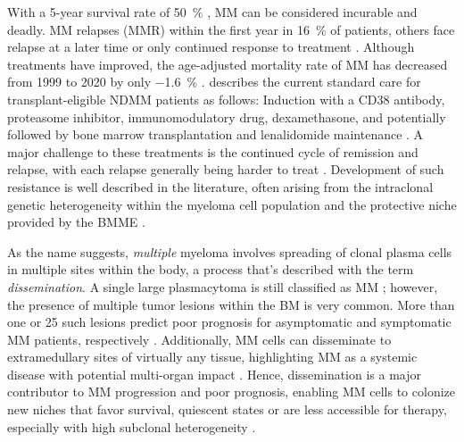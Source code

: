 With a 5-year survival rate of \SI{50}{\percent}
\cite{turessonRapidlyChangingMyeloma2018}, \ac{MM} can be considered incurable
and deadly. \ac{MM} relapses (\acs{MMR}) within the first year in \SI{16}{\percent} of
patients, others face relapse at a later time or only continued
response to treatment \cite{majithiaEarlyRelapseFollowing2016}. Although
treatments have improved, the age-adjusted mortality rate of \ac{MM} has
decreased from 1999 to 2020 by only \SI{-1.6}{\percent}
\cite{doddiDisparitiesMultipleMyeloma2024}.
\citet{engelhardtFunctionalCureLongterm2024} describes the current standard care
for transplant-eligible \ac{NDMM} patients as follows: Induction
with a CD38 antibody, proteasome inhibitor, immunomodulatory drug,
dexamethasone, and potentially followed by bone marrow transplantation and
lenalidomide maintenance \cite{rajkumarMultipleMyelomaCurrent2020}. A major
challenge to these treatments is the continued cycle of remission and relapse,
with each relapse generally being harder to treat
\cite{podarRelapsedRefractoryMultiple2021}. Development of such resistance is
well described in the literature, often arising from the intraclonal genetic
heterogeneity within the myeloma cell population and the protective niche
provided by the \ac{BMME}
\cite{solimandoDrugResistanceMultiple2022}.



%
\label{sec:intro_myeloma_dissemination}%
As the name suggests, \emph{multiple} myeloma involves spreading of clonal
plasma cells in multiple sites within the body, a process that's described with
the term \emph{dissemination}. A single large plasmacytoma is still classified
as \ac{MM} \cite{rajkumarInternationalMyelomaWorking2014}; however, the presence
of multiple tumor lesions within the \ac{BM} is very common. More than one or 25
such lesions predict poor prognosis for asymptomatic and symptomatic \ac{MM}
patients, respectively \cite{kastritisPrognosticImportancePresence2014,
maiMagneticResonanceImagingbased2015a}. Additionally, \ac{MM} cells can
disseminate to extramedullary sites of virtually any tissue, highlighting
\ac{MM} as a systemic disease with potential multi-organ impact
\cite{rajkumarMultipleMyelomaCurrent2020,
bladeExtramedullaryDiseaseMultiple2022}. Hence, dissemination is a major
contributor to \ac{MM} progression and poor prognosis, enabling \ac{MM} cells to
colonize new niches that favor survival, quiescent states or are less accessible
for therapy, especially with high subclonal heterogeneity
\cite{forsterMolecularImpactTumor2022, keatsClonalCompetitionAlternating2012}.

